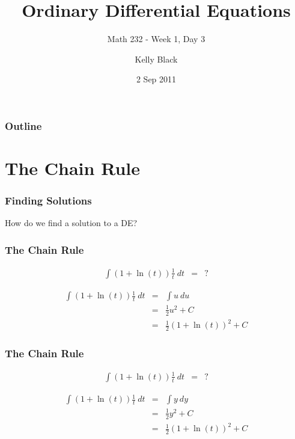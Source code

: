 \documentclass{beamer}
\newcommand{\half}{\mbox{$\frac{1}{2}$}}
\newcommand{\lp}{\left(}
\newcommand{\rp}{\right)}
\begin{document}
\title{Ordinary Differential Equations}
\subtitle{Math 232 - Week 1, Day 3}

\author{Kelly Black}
\date{2 Sep 2011}

\begin{frame}
  \titlepage
\end{frame}

\begin{frame}
  \frametitle{Outline}
\end{frame}


\section{The Chain Rule}


\begin{frame}
  \frametitle{Finding Solutions}

  How do we find a solution to a DE?



\end{frame}


\begin{frame}
  \frametitle{The Chain Rule}

  \begin{eqnarray*}
    \int \lp 1 + \ln(t) \rp \frac{1}{t} ~ dt & = & ?
  \end{eqnarray*}


   {
    \begin{eqnarray*}
      \int \lp 1 + \ln(t) \rp \frac{1}{t} ~ dt & = & \int u ~ du \\
      & = & \half u^2 + C \\
      & = & \half \lp 1+\ln(t) \rp^2 + C
    \end{eqnarray*}
  }


\end{frame}

\begin{frame}
  \frametitle{The Chain Rule}

  \begin{eqnarray*}
    \int \lp 1 + \ln(t) \rp \frac{1}{t} ~ dt & = & ?
  \end{eqnarray*}


   {
    \begin{eqnarray*}
      \int \lp 1 + \ln(t) \rp \frac{1}{t} ~ dt & = & \int y ~ dy \\
      & = & \half y^2 + C \\
      & = & \half \lp 1+\ln(t) \rp^2 + C
    \end{eqnarray*}
  }


\end{frame}
\end{document}
